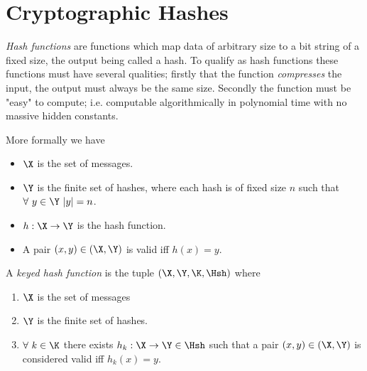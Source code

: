 \section{Cryptographic Hashes}

\textit{Hash functions} are functions which
map data of arbitrary size to a bit string of a fixed size,
the output being called a hash.
To qualify as hash functions these functions must have several qualities;
firstly that the function \textit{compresses} the input,
the output must always be the same size.
Secondly the function must be "easy" to compute;
i.e. computable algorithmically in polynomial time
with no massive hidden constants.

More formally we have
\begin{itemize}
	\item $\X$ is the set of messages.
	\item $\Y$ is the finite set of hashes,
		where each hash is of fixed size $n$ such that
		$\forall\ y \in \Y\ |y| = n$.
	\item $h : \X \rightarrow \Y$ is the hash function.
	\item A pair $(x,y) \in (\X,\Y)$ is valid iff $h(x) = y$.
\end{itemize}

\begin{definition}
	A \textit{keyed hash function} is the tuple $(\X,\Y,\K,\Hsh)$ where
	\begin{enumerate}
		\item $\X$ is the set of messages
		\item $\Y$ is the finite set of hashes.
		\item $\forall\ k \in \K$ there exists $h_k : \X \rightarrow \Y \in \Hsh$
			such that a pair $(x,y) \in (\X, \Y)$ is considered valid iff $h_k(x) = y$.
	\end{enumerate}
\end{definition}

